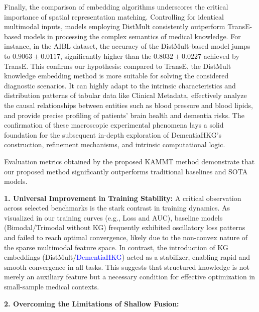\documentclass[lettersize,journal]{IEEEtran}
\begin{document}
Finally, the comparison of embedding algorithms underscores the critical importance of spatial representation matching. Controlling for identical multimodal inputs, models employing DistMult consistently outperform TransE-based models in processing the complex semantics of medical knowledge. For instance, in the AIBL dataset, the accuracy of the DistMult-based model jumps to $0.9063 \pm 0.0117$, significantly higher than the $0.8032 \pm 0.0227$ achieved by TransE. This confirms our hypothesis: compared to TransE, the DistMult knowledge embedding method is more suitable for solving the considered diagnostic scenarios. It can highly adapt to the intrinsic characteristics and distribution patterns of tabular data like Clinical Metadata, effectively analyze the causal relationships between entities such as blood pressure and blood lipids, and provide precise profiling of patients' brain health and dementia risks. The confirmation of these macroscopic experimental phenomena lays a solid foundation for the subsequent in-depth exploration of DementiaHKG's construction, refinement mechanisms, and intrinsic computational logic.
















    
    Evaluation metrics obtained by the proposed KAMMT method demonstrate that our proposed method significantly outperforms traditional baselines and SOTA models.

    \textbf{1. Universal Improvement in Training Stability:}
    A critical observation across selected benchmarks is the stark contrast in training dynamics. As visualized in our training curves (e.g., Loss and AUC), baseline models (Bimodal/Trimodal without KG) frequently exhibited oscillatory loss patterns and failed to reach optimal convergence, likely due to the non-convex nature of the sparse multimodal feature space. In contrast, the introduction of KG embeddings (DistMult/\textcolor{blue}{DementiaHKG}) acted as a stabilizer, enabling rapid and smooth convergence in all tasks. This suggests that structured knowledge is not merely an auxiliary feature but a necessary condition for effective optimization in small-sample medical contexts.

\textbf{2. Overcoming the Limitations of Shallow Fusion:}
\end{document}
